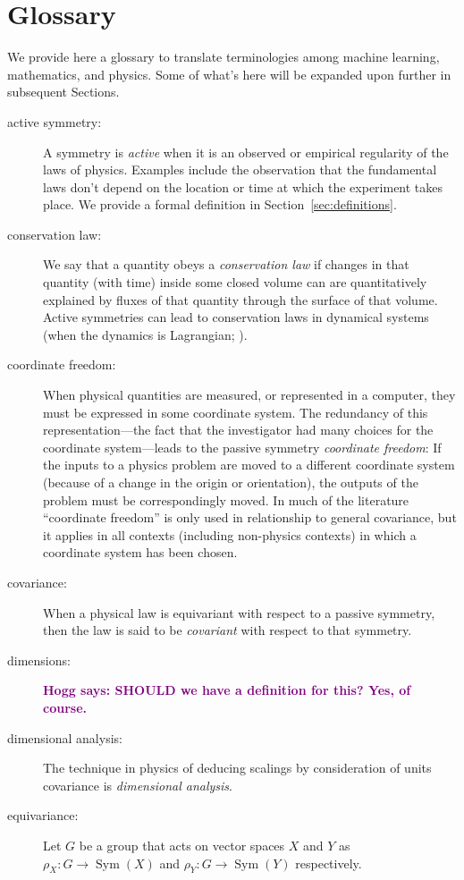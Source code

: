 \documentclass[preprint]{article} %
\newcommand{\sectionname}{Section}
\newcommand{\secref}[1]{\sectionname~\ref{#1}}
\newcommand{\hogg}[1]{\textcolor{purple}{\textbf{Hogg says: #1}}}
\begin{document}
\section{Glossary}\label{sec:glossary}
We provide here a glossary to translate terminologies among machine learning, mathematics, and physics.
Some of what's here will be expanded upon further in subsequent Sections.
\begin{description}
\item[active symmetry:]
  A symmetry is \emph{active} when it is an observed or empirical regularity of the laws of physics.
  Examples include the observation that the fundamental laws don't depend on the location or time at which the experiment takes place.
  We provide a formal definition in \secref{sec:definitions}.
\item[conservation law:]
  We say that a quantity obeys a \emph{conservation law} if changes in that quantity (with time) inside some closed volume can are quantitatively explained by fluxes of that quantity through the surface of that volume.
  Active symmetries can lead to conservation laws in dynamical systems (when the dynamics is Lagrangian; \citealt{noether}).
\item[coordinate freedom:]
  When physical quantities are measured, or represented in a computer, they must be expressed in some coordinate system.
  The redundancy of this representation---the fact that the investigator had many choices for the coordinate system---leads to the passive symmetry \emph{coordinate freedom}:
  If the inputs to a physics problem are moved to a different coordinate system (because of a change in the origin or orientation), the outputs of the problem must be correspondingly moved.
  In much of the literature ``coordinate freedom'' is only used in relationship to general covariance, but it applies in all contexts (including non-physics contexts) in which a coordinate system has been chosen.
\item[covariance:]
  When a physical law is equivariant with respect to a passive symmetry, then the law is said to be \emph{covariant} with respect to that symmetry.
\item[dimensions:]
  \hogg{SHOULD we have a definition for this? Yes, of course.}
\item[dimensional analysis:]
  The technique in physics of deducing scalings by consideration of units covariance is \emph{dimensional analysis}.
\item[equivariance:]
  Let $G$ be a group that acts on vector spaces $X$ and $Y$ as $\rho_X:G\to \operatorname{Sym}(X)$ and $\rho_Y:G\to \operatorname{Sym}(Y)$ respectively.

\end{description}
\end{document}
